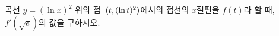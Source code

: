 곡선 $y=(\ln x)^2$ 위의 점~$(t{,}\mkern3mu\mathopen{}(\ln t)^2)$에서의 접선의 $x$절편을 $f(t)$라 할 때, $f'(\sqrt{e})$의 값을 구하시오.
